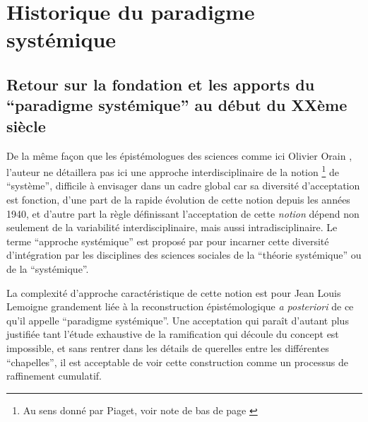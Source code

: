 


\graphicspath{{FigureAnnexe/}}

\renewcommand{\appendixpagename}{Annexes}
\renewcommand{\appendixtocname}{Annexes}



\appendix
\nopartblankpage

\appendixpage



\chapter{Historique du paradigme systémique}

\section{Retour sur la fondation et les apports du \enquote{paradigme systémique} au début du XXème siècle}
\label{ssec:systemique}

De la même façon que les épistémologues des sciences comme ici Olivier Orain \autocite{Orain2001}, l'auteur ne détaillera pas ici une approche interdisciplinaire de la notion \footnote{Au sens donné par Piaget, voir note de bas de page \autocite {Orain2001}} de \enquote{système}, difficile à envisager dans un cadre global car sa diversité d'acceptation est fonction, d'une part de la rapide évolution de cette notion depuis les années 1940, et d'autre part la règle définissant l'acceptation de cette \textit{notion} dépend non seulement de la variabilité interdisciplinaire, mais aussi intradisciplinaire. Le terme \enquote{approche systémique} est proposé par \autocite{Orain2001} pour incarner cette diversité d'intégration par les disciplines des sciences sociales de la \enquote{théorie systémique} ou de la \enquote{systémique}.

La complexité d'approche caractéristique de cette notion est pour Jean Louis Lemoigne grandement liée à la reconstruction épistémologique \textit{a posteriori} de ce qu'il appelle \enquote{paradigme systémique}. Une acceptation qui paraît d'autant plus justifiée tant l'étude exhaustive de la ramification qui découle du concept est impossible, et sans rentrer dans les détails de querelles entre les différentes \enquote{chapelles}, il est acceptable de voir cette construction comme un processus de raffinement cumulatif. 

